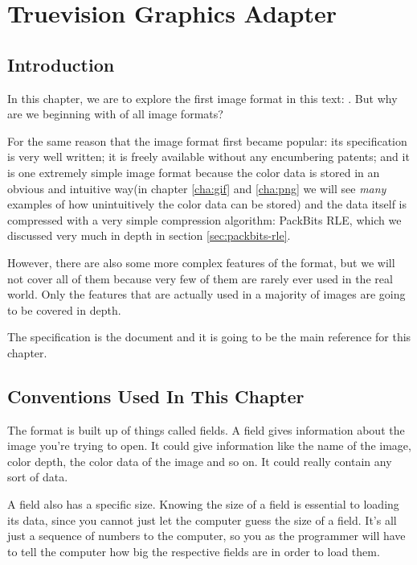 \begin{comment}
  
\end{comment}

\chapter{Truevision Graphics Adapter}
\label{cha:tga}

\section{Introduction}
\label{sec:tga-introduction}

In this chapter, we are to explore the first image format in this
text: \tga. But why are we beginning with \tga of all image
formats?

For the same reason that the image format first became popular: its
specification is very well written; it is freely available without any
encumbering patents; and it is one extremely simple image format
because the color data is stored in an obvious and intuitive way(in
chapter \ref{cha:gif} and \ref{cha:png} we will see \textit{many}
examples of how unintuitively the color data can be stored) and the
data itself is compressed with a very simple compression algorithm:
PackBits RLE, which we discussed very much in depth in section
\ref{sec:packbits-rle}. \cite{murray1996encyclopedia}

However, there are also some more complex features of the \tga format,
but we will not cover all of them because very few of them are rarely ever
used in the real world. Only the features that are actually used in a
majority of \tga images are going to be covered in depth.

The \tga specification is the document
\cite{91:_truev_tga_file_format_specif} and it is going to be the main
reference for this chapter.

\section{Conventions Used In This Chapter}

The \tga format is built up of things called fields. A
field gives information about the image you're trying to open. It
could give information like the name of the image, color depth, the
color data of the image and so on. It could really contain any sort of
data.

A field also has a specific size. Knowing the size of a field is
essential to loading its data, since you cannot just let the computer
guess the size of a field. It's all just a sequence of numbers to the
computer, so you as the programmer will have to tell the computer how
big the respective fields are in order to load them.

